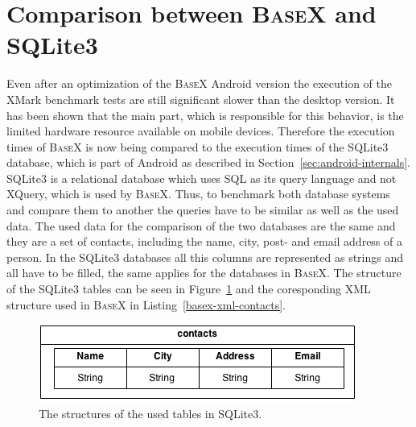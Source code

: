 \section{Comparison between \textsc{BaseX} and SQLite3}
\label{sec:comparison-between-basex-and-sqlite}
Even after an optimization of the \textsc{BaseX} Android version the execution of the XMark benchmark tests are still significant slower than the desktop version.
It has been shown that the main part, which is responsible for this behavior, is the limited hardware resource available on mobile devices.
Therefore the execution times of \textsc{BaseX} is now being compared to the execution times of the SQLite3 database, which is part of Android as described in Section~\ref{sec:android-internals}.
SQLite3 is a relational database which uses SQL as its query language and not XQuery, which is used by \textsc{BaseX}.
Thus, to benchmark both database systems and compare them to another the queries have to be similar as well as the used data.
The used data for the comparison of the two databases are the same and they are a set of contacts, including the name, city, post- and email address of a person.
In the SQLite3 databases all this columns are represented as strings and all have to be filled, the same applies for the databases in \textsc{BaseX}.
The structure of the SQLite3 tables can be seen in Figure~\ref{fig:sqlite-tables-contacts} and the coresponding XML structure used in \textsc{BaseX} in Listing~\ref{basex-xml-contacts}.

\begin{figure}[h]
\begin{center}
\includegraphics[scale=0.65]{images/sqlite-tables.png} 
\caption{The structures of the used tables in SQLite3.}
\label{fig:sqlite-tables-contacts}
\end{center}
\end{figure}




